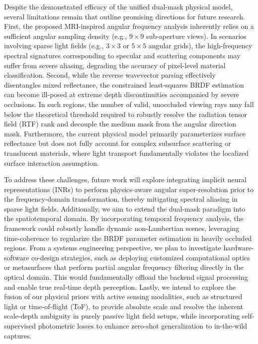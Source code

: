 Despite the demonstrated efficacy of the unified dual-mask physical model, several limitations remain that outline promising directions for future research. First, the proposed MRI-inspired angular frequency analysis inherently relies on a sufficient angular sampling density (e.g., \(9 \times 9\) sub-aperture views). In scenarios involving sparse light fields (e.g., \(3 \times 3\) or \(5 \times 5\) angular grids), the high-frequency spectral signatures corresponding to specular and scattering components may suffer from severe aliasing, degrading the accuracy of pixel-level material classification. Second, while the reverse wavevector parsing effectively disentangles mixed reflectance, the constrained least-squares BRDF estimation can become ill-posed at extreme depth discontinuities accompanied by severe occlusions. In such regions, the number of valid, unoccluded viewing rays may fall below the theoretical threshold required to robustly resolve the radiation tensor field (RTF) rank and decouple the medium mask from the angular direction mask. Furthermore, the current physical model primarily parameterizes surface reflectance but does not fully account for complex subsurface scattering or translucent materials, where light transport fundamentally violates the localized surface interaction assumption.

To address these challenges, future work will explore integrating implicit neural representations (INRs) to perform physics-aware angular super-resolution prior to the frequency-domain transformation, thereby mitigating spectral aliasing in sparse light fields. Additionally, we aim to extend the dual-mask paradigm into the spatiotemporal domain. By incorporating temporal frequency analysis, the framework could robustly handle dynamic non-Lambertian scenes, leveraging time-coherence to regularize the BRDF parameter estimation in heavily occluded regions. From a systems engineering perspective, we plan to investigate hardware-software co-design strategies, such as deploying customized computational optics or metasurfaces that perform partial angular frequency filtering directly in the optical domain. This would fundamentally offload the backend signal processing and enable true real-time depth perception. Lastly, we intend to explore the fusion of our physical priors with active sensing modalities, such as structured light or time-of-flight (ToF), to provide absolute scale and resolve the inherent scale-depth ambiguity in purely passive light field setups, while incorporating self-supervised photometric losses to enhance zero-shot generalization to in-the-wild captures.